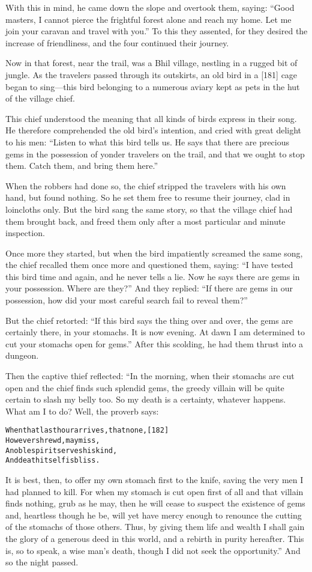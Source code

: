 \documentclass{article}
\renewenvironment{verbatim}{\begin{alltt}\normalfont\begin{centering}}{\end{centering}\end{alltt}}
\begin{document}
With this in mind, he came down the slope and overtook them,
saying:
``Good masters, I cannot pierce the frightful forest alone and reach my home. Let me join your caravan and travel with you.''
To this they assented, for they desired the increase of
friendliness, and the four continued their journey.

Now in that forest, near the trail, was a Bhil village, nestling in
a rugged bit of jungle. As the travelers passed through its
outskirts, an old bird in a [181] cage began to sing---this bird
belonging to a numerous aviary kept as pets in the hut of the
village chief.

This chief understood the meaning that all kinds of birds express
in their song. He therefore comprehended the old bird's intention,
and cried with great delight to his men:
``Listen to what this bird tells us. He says that there are precious gems in the possession of yonder travelers on the trail, and that we ought to stop them. Catch them, and bring them here.''

When the robbers had done so, the chief stripped the travelers with
his own hand, but found nothing. So he set them free to resume
their journey, clad in loincloths only. But the bird sang the same
story, so that the village chief had them brought back, and freed
them only after a most particular and minute inspection.

Once more they started, but when the bird impatiently screamed the
same song, the chief recalled them once more and questioned them,
saying:
``I have tested this bird time and again, and he never tells a lie. Now he says there are gems in your possession. Where are they?''
And they replied:
``If there are gems in our possession, how did your most careful search fail to reveal them?''

But the chief retorted:
``If this bird says the thing over and over, the gems are certainly there, in your stomachs. It is now evening. At dawn I am determined to cut your stomachs open for gems.''
After this scolding, he had them thrust into a dungeon.

Then the captive thief reflected: “In the morning, when their
stomachs are cut open and the chief finds such splendid gems, the
greedy villain will be quite certain to slash my belly too. So my
death is a certainty, whatever happens. What am I to do? Well, the
proverb says:

\begin{verbatim}
When that last hour arrives, that none,                 [182]
    However shrewd, may miss,
A noble spirit serves his kind,
    And death itself is bliss.
\end{verbatim}
It is best, then, to offer my own stomach first to the knife,
saving the very men I had planned to kill. For when my stomach is
cut open first of all and that villain finds nothing, grub as he
may, then he will cease to suspect the existence of gems and,
heartless though he be, will yet have mercy enough to renounce the
cutting of the stomachs of those others. Thus, by giving them life
and wealth I shall gain the glory of a generous deed in this world,
and a rebirth in purity hereafter. This is, so to speak, a wise
man's death, though I did not seek the opportunity.” And so the
night passed.
\end{document}
